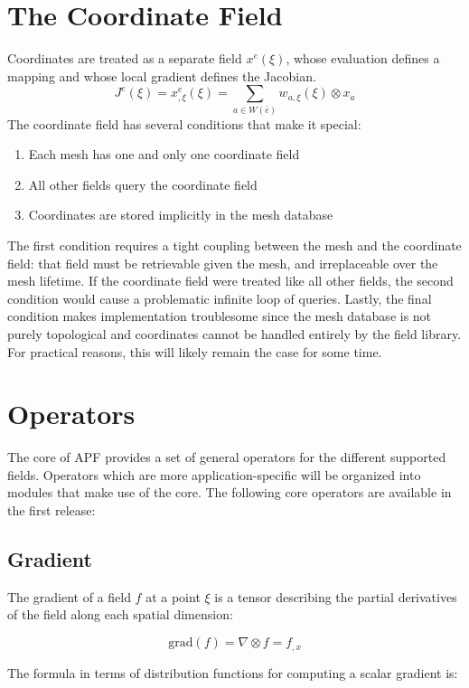 \documentclass{article}
\begin{document}
\section{The Coordinate Field}
Coordinates are treated
as a separate field $x^e(\xi)$, whose evaluation defines a mapping and whose
local gradient defines the Jacobian.
\[J^e(\xi) = x_{,\xi}^e(\xi) = \sum_{a\in W(\bar{e})} w_{a,\xi}(\xi) \otimes x_a\]
The coordinate field has several conditions that make it special:
\begin{enumerate}
\item Each mesh has one and only one coordinate field
\item All other fields query the coordinate field
\item Coordinates are stored implicitly in the mesh database
\end{enumerate}

The first condition requires a tight coupling between the mesh and
the coordinate field: that field must be retrievable given the mesh,
and irreplaceable over the mesh lifetime.
If the coordinate field were treated like all other fields,
the second condition would cause a problematic infinite loop of queries.
Lastly, the final condition makes implementation troublesome since
the mesh database is not purely
topological and coordinates cannot be handled entirely by the field
library.
For practical reasons, this will likely remain the case for some time.

\section{Operators}

The core of APF provides a set of general operators for the different
supported fields.
Operators which are more application-specific will be organized into
modules that make use of the core.
The following core operators are available in the first release:

\subsection{Gradient}
The gradient of a field $f$ at a point $\xi$ is a tensor
describing the partial derivatives of the field along each spatial dimension:

\[ \text{grad}(f) = \nabla \otimes f = f_{,x} \]

The formula in terms of distribution functions for computing a scalar gradient is:
\end{document}
